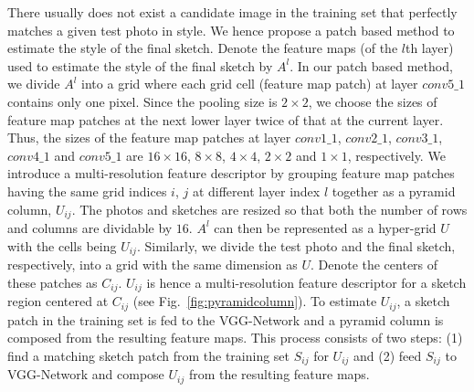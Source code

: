 \documentclass[10pt,twocolumn,letterpaper]{article}
\begin{document}
There usually does not exist a candidate image in the training set that perfectly matches a given test photo in style. We hence propose a patch based method to estimate the style of the final sketch. Denote the feature maps (of the $l$th layer) used to estimate the style of the final sketch by $A^{l}$. In our patch based method, we divide $A^{l}$ into a grid where each grid cell (feature map patch) at layer $conv5\_1$ contains only one pixel. Since the pooling size is $2\times2$, we choose the sizes of feature map patches at the next lower layer twice of that at the current layer. Thus, the sizes of the feature map patches at layer $conv1\_1$, $conv2\_1$, $conv3\_1$, $conv4\_1$ and $conv5\_1$ are $16\times16$, $8\times8$, $4\times4$, $2\times2$ and $1\times1$, respectively. We introduce a multi-resolution feature descriptor by grouping feature map patches having the same grid indices $i$, $j$ at different layer index $l$ together as a pyramid column, $U_{ij}$. The photos and sketches are resized so that both the number of rows and columns are dividable by $16$. $A^{l}$ can then be represented as a hyper-grid $U$ with the cells being $U_{ij}$. Similarly, we divide the test photo and the final sketch, respectively, into a grid with the same dimension as $U$. Denote the centers of these patches as $C_{ij}$. $U_{ij}$ is hence a multi-resolution feature descriptor for a sketch region centered at $C_{ij}$ (see Fig.~\ref{fig:pyramidcolumn}). 
To estimate $U_{ij}$, a sketch patch in the training set is fed to the VGG-Network and a pyramid column is composed from the resulting feature maps. This process consists of two steps: (1) find a matching sketch patch from the training set $S_{ij}$ for $U_{ij}$ and (2) feed $S_{ij}$ to VGG-Network and compose $U_{ij}$ from the resulting feature maps.\par
\end{document}
